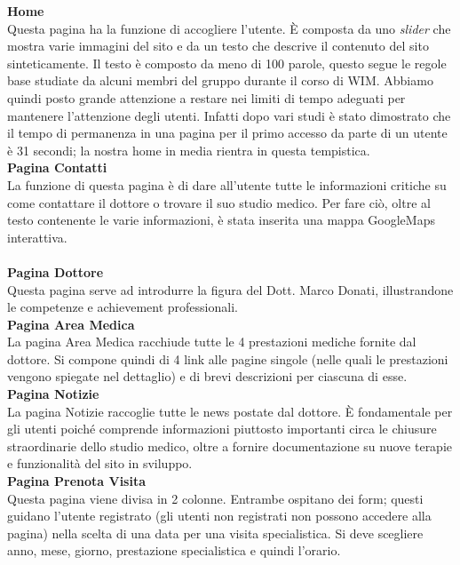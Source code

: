 \bigskip

\textbf{Home} \\ 
Questa pagina ha la funzione di accogliere l’utente. È composta da uno \textit{slider} che mostra varie immagini del sito e da un testo che descrive il contenuto del sito sinteticamente.
Il testo è composto da meno di 100 parole, questo segue le regole base studiate da alcuni membri del gruppo durante il corso di WIM. Abbiamo quindi posto grande attenzione a restare nei limiti di tempo adeguati per mantenere l’attenzione degli utenti.
Infatti dopo vari studi è stato dimostrato che il tempo di permanenza in una pagina per il primo accesso da parte di un utente è 31 secondi; la nostra home in media rientra in questa tempistica. \\

\textbf{Pagina Contatti} \\ 
La funzione di questa pagina è di dare all’utente tutte le informazioni critiche su come contattare il dottore o trovare il suo studio medico.
Per fare ciò, oltre al testo contenente le varie informazioni, è stata inserita una mappa GoogleMaps interattiva. \\ \\

\textbf{Pagina Dottore} \\
Questa pagina serve ad introdurre la figura del Dott. Marco Donati, illustrandone le competenze e achievement professionali. \\

\textbf{Pagina Area Medica} \\
La pagina Area Medica racchiude tutte le 4 prestazioni mediche fornite dal dottore. Si compone quindi di 4 link alle pagine singole (nelle quali le prestazioni vengono spiegate nel dettaglio) e di brevi descrizioni per ciascuna di esse. \\

\textbf{Pagina Notizie} \\
La pagina Notizie raccoglie tutte le news postate dal dottore. È fondamentale per gli utenti poiché comprende informazioni piuttosto importanti circa le chiusure straordinarie dello studio medico, oltre a fornire documentazione su nuove terapie e funzionalità del sito in sviluppo. \\

\textbf{Pagina Prenota Visita} \\
Questa pagina viene divisa in 2 colonne. Entrambe ospitano dei form;
questi guidano l’utente registrato (gli utenti non registrati non possono accedere alla pagina) nella scelta di una data per una visita specialistica.
Si deve scegliere anno, mese, giorno, prestazione specialistica e quindi l’orario. \\

